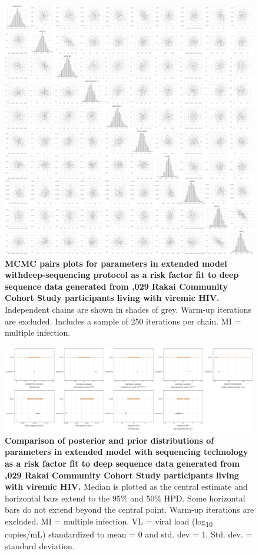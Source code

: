 \documentclass[10pt,letterpaper]{article}
\begin{document}
\begin{figure}[!ht]
 \includegraphics[width=1\textwidth]{../../figures/empirical_seqtech_pairs.pdf}
\caption{{\bf MCMC pairs plots for parameters in extended model withdeep-sequencing protocol as a risk factor fit to deep sequence data generated from ,029 Rakai Community Cohort Study participants living with viremic HIV.} Independent chains are shown in shades of grey. Warm-up iterations are excluded. Includes a sample of 250 iterations per chain. MI = multiple infection. }
\end{figure}

\begin{figure}[!ht]
 \includegraphics[width=1\textwidth]{../../figures/empirical_seqtech_prior.pdf}
\caption{{\bf Comparison of posterior and prior distributions of parameters in extended model with sequencing technology as a risk factor fit to deep sequence data generated from ,029 Rakai Community Cohort Study participants living with viremic HIV.} Median is plotted as the central estimate and horizontal bars extend to the 95\% and 50\% HPD. Some horizontal bars do not extend beyond the central point. Warm-up iterations are excluded. MI = multiple infection. VL = viral load (log\textsubscript{10} copies/mL) standardized to mean = 0 and std. dev = 1. Std. dev. = standard deviation. }
\end{figure}
\end{document}
